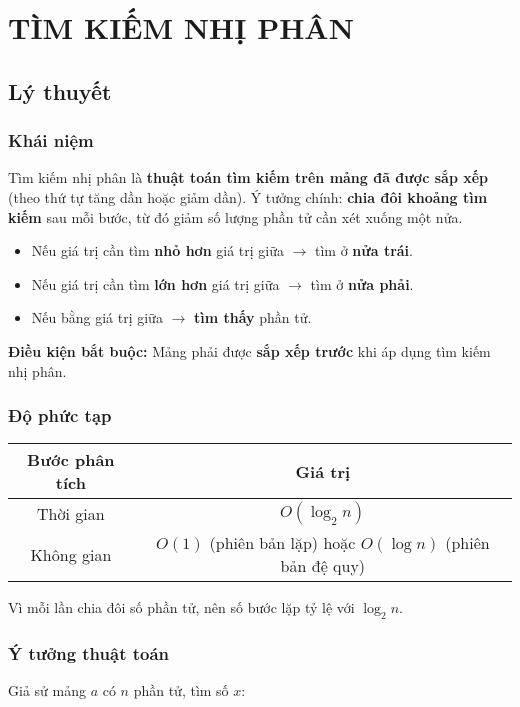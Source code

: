 \chapter{TÌM KIẾM NHỊ PHÂN}

\minitoc

\section{Lý thuyết}

\subsection{Khái niệm}
Tìm kiếm nhị phân là \textbf{thuật toán tìm kiếm trên mảng đã được sắp xếp} (theo thứ tự tăng dần hoặc giảm dần).  
Ý tưởng chính: \textbf{chia đôi khoảng tìm kiếm} sau mỗi bước, từ đó giảm số lượng phần tử cần xét xuống một nửa.

\begin{itemize}
    \item Nếu giá trị cần tìm \textbf{nhỏ hơn} giá trị giữa $\rightarrow$ tìm ở \textbf{nửa trái}.
    \item Nếu giá trị cần tìm \textbf{lớn hơn} giá trị giữa $\rightarrow$ tìm ở \textbf{nửa phải}.
    \item Nếu bằng giá trị giữa $\rightarrow$ \textbf{tìm thấy} phần tử.
\end{itemize}

\textbf{Điều kiện bắt buộc:} Mảng phải được \textbf{sắp xếp trước} khi áp dụng tìm kiếm nhị phân.

\subsection{Độ phức tạp}

\begin{center}
\begin{tabular}{|c|c|}
\hline
\textbf{Bước phân tích} & \textbf{Giá trị} \\
\hline
Thời gian & $O(\log_2 n)$ \\
\hline
Không gian & $O(1)$ (phiên bản lặp) hoặc $O(\log n)$ (phiên bản đệ quy) \\
\hline
\end{tabular}
\end{center}

Vì mỗi lần chia đôi số phần tử, nên số bước lặp tỷ lệ với $\log_2 n$.


\subsection{Ý tưởng thuật toán}
Giả sử mảng $a$ có $n$ phần tử, tìm số $x$:

